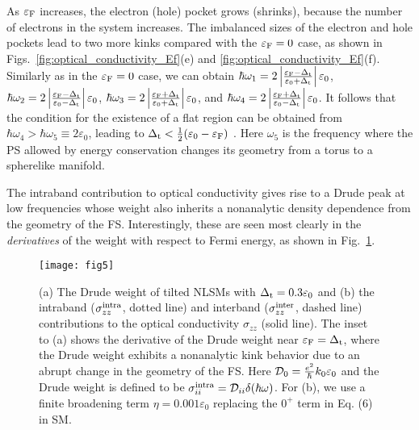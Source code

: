 \documentclass[aps,twocolumn,floatfix]{revtex4-1}
\begin{document}
As $\varepsilon_{\rm F}$ increases, the electron (hole) pocket grows (shrinks), because the number of electrons in the system increases. The imbalanced sizes of the electron and hole pockets lead to two more kinks compared with the $\varepsilon_{\rm F}=0$ case, as shown in Figs.~\ref{fig:optical_conductivity_Ef}(e) and \ref{fig:optical_conductivity_Ef}(f). Similarly as in the $\varepsilon_{\rm F}=0$ case, we can obtain
$\hbar\omega_1=2\left|\frac{\varepsilon_{\rm F}-\Delta_{\rm t}}{\varepsilon_0+\Delta_{\rm t}}\right|\varepsilon_0$,
$\hbar\omega_2=2\left|\frac{\varepsilon_{\rm F}-\Delta_{\rm t}}{\varepsilon_0-\Delta_{\rm t}}\right|\varepsilon_0$,
$\hbar\omega_3=2\left|\frac{\varepsilon_{\rm F}+\Delta_{\rm t}}{\varepsilon_0+\Delta_{\rm t}}\right|\varepsilon_0$, and
$\hbar\omega_4=2\left|\frac{\varepsilon_{\rm F}+\Delta_{\rm t}}{\varepsilon_0-\Delta_{\rm t}}\right|\varepsilon_0$.
It follows that the condition for the existence of a flat region can be obtained from $\hbar\omega_4>\hbar\omega_5\equiv 2\varepsilon_0$, leading to  $\Delta_{\rm t}<\frac{1}{2}(\varepsilon_0-\varepsilon_{\rm F})$  \cite{supplemental}. Here $\omega_5$ is the frequency where the PS allowed by energy conservation changes its geometry from a torus to a spherelike manifold.

The intraband contribution to optical conductivity gives rise to a Drude peak at low frequencies whose weight also inherits a nonanalytic density dependence from the geometry of the FS. Interestingly, these are seen most clearly in the {\it derivatives} of the weight with respect to Fermi energy, as shown in Fig.~\ref{fig:Drude_weight}.


\begin{figure}[!htb]
\texttt{[image: fig5]}
\caption{
(a) The Drude weight of tilted NLSMs with $\Delta_{\rm t}=0.3\varepsilon_0$ and (b)
the intraband ($\sigma_{zz}^{\rm intra}$, dotted line) and interband ($\sigma_{zz}^{\rm inter}$, dashed line) contributions to the optical conductivity $\sigma_{zz}$ (solid line).
The inset to (a) shows the derivative of the Drude weight near $\varepsilon_{\rm F}=\Delta_{\rm t}$, where the Drude weight exhibits a nonanalytic kink behavior due to an abrupt change in the geometry of the FS. Here ${\cal D}_0=\frac{e^2}{\hbar}k_0\varepsilon_0$ and the Drude weight is defined to be $\sigma_{ii}^\mathrm{intra}={\cal D}_{ii}\delta(\hbar\omega)$. For (b), we use a finite broadening term $\eta=0.001\varepsilon_0$ replacing the $0^{+}$ term in Eq. (6) in SM.
}
\label{fig:Drude_weight}
\end{figure}
\end{document}
